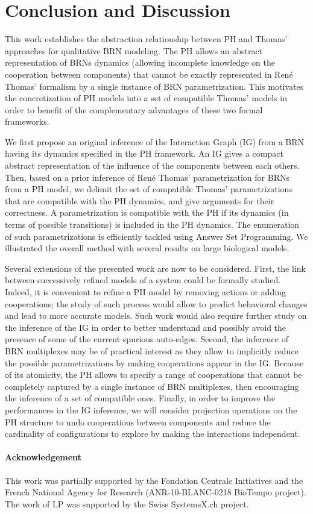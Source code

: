 \section{Conclusion and Discussion}

This work establishes the abstraction relationship between PH and Thomas' approaches for
qualitative BRN modeling.
The PH allows an abstract representation of BRNs dynamics (allowing incomplete knowledge on the
cooperation between components) that cannot be exactly represented in Ren\'e Thomas' formalism by a
single instance of BRN parametrization.
This motivates the concretization of PH models into a set of compatible Thomas' models in order to benefit
of the complementary advantages of these two formal frameworks.

We first propose an original inference of the Interaction Graph (IG) from a BRN
having its dynamics specified in the PH framework.
An IG gives a compact abstract representation of the influence of the components between each
others.
Then, based on a prior inference of Ren\'e Thomas' parametrization for BRNs from a PH model, we
delimit the set of compatible Thomas' parametrizations that are compatible with the PH dynamics,
and give arguments for their correctness.
A parametrization is compatible with the PH if its dynamics (in terms of possible transitions) is included in the PH dynamics.
The enumeration of such parametrizations is efficiently tackled using Answer Set Programming.
We illustrated the overall method with several results on large biological models.

Several extensions of the presented work are now to be considered.
First, the link between successively refined models of a system could be formally studied.
Indeed, it is convenient to refine a PH model by removing actions or adding cooperations;
the study of such process would allow to predict behavioral changes and lead to more accurate models.
Such work would also require further study on the inference of the IG in order to better understand and possibly avoid
the presence of some of the current spurious auto-edges.
Second, the inference of BRN multiplexes \cite{BernotMultiplexes} may be of practical interest 
as they allow to implicitly reduce the possible parametrizations by making cooperations appear
in the IG.
Because of its atomicity, the PH allows to specify a range of cooperations that cannot be
completely captured by a single instance of BRN multiplexes, then encouraging the inference of a set
of compatible ones.
Finally, in order to improve the performances in the IG inference, we will consider projection operations on
the PH structure to undo cooperations between components and reduce the cardinality of
configurations to explore by making the interactions independent.

\paragraph{Acknowledgement}
This work was partially supported by the Fondation Centrale Initiatives and
the French National Agency for Research (ANR-10-BLANC-0218 BioTempo project).
The work of LP was supported by the Swiss SystemsX.ch project.
